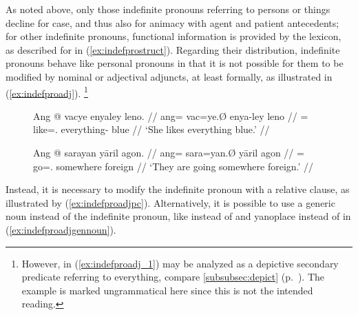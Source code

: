 \begin{figure}
\begin{morphlex}
\ex\label{ex:indefpromorphlex}
\xe
\end{morphlex}
\end{figure}

As noted above, only those indefinite pronouns referring to persons or things
decline for case, and thus also for animacy with agent and patient antecedents;
for other indefinite pronouns, functional information is provided by the
lexicon, as described for  in (\ref{ex:indefprostruct}).
Regarding their distribution, indefinite pronouns behave like personal pronouns
in that it is not possible for them to be modified by nominal or adjectival
adjuncts, at least formally, as illustrated in (\ref{ex:indefproadj}).%
\footnote{However,  in (\ref{ex:indefproadj_1}) may be
analyzed as a depictive secondary predicate referring to 
{everything}, compare \autoref{subsubsec:depict}
(p.~\pageref{subsubsec:depict}). The example is marked ungrammatical here since
this is not the intended reading.}

\begin{figure}
\pex\label{ex:indefproadj}
\a\label{ex:indefproadj_1}\ljudge*\begingl
	\gla Ang @ vacye enyaley leno. //
	\glb ang= vac=ye.Ø enya-ley leno //
	\glc \AgtT{}= like=\TsgF{}.\Top{} everything-\PargI{} blue //
	\glft `She likes everything blue.' //
\endgl

\a\label{ex:indefproadj_2}\ljudge*\begingl
	\gla Ang @ sarayan yāril agon. //
	\glb ang= sara=yan.Ø yāril agon //
	\glc \AgtT{}= go=\TplM{}.\Top{} somewhere foreign //
	\glft `They are going somewhere foreign.' //
\endgl
\xe
\end{figure}

Instead, it is necessary to modify the indefinite pronoun with a relative
clause, as illustrated by (\ref{ex:indefproadjpc}). Alternatively, it is
possible to use a generic noun instead of the indefinite pronoun, like
 instead of  and 
{yano}{place} instead of  in
(\ref{ex:indefproadjgennoun}).

